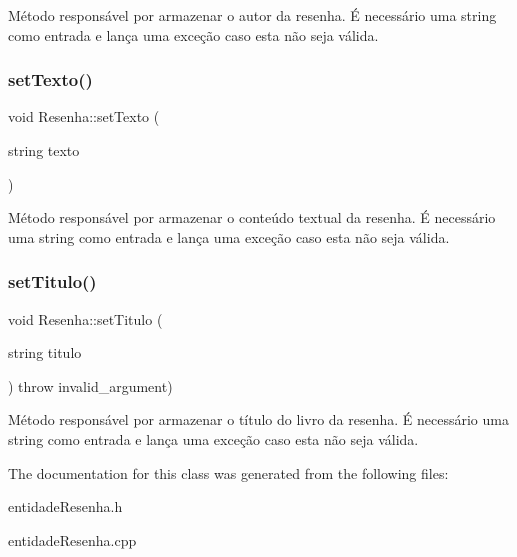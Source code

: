 Método responsável por armazenar o autor da resenha. É necessário uma string como entrada e lança uma exceção caso esta não seja válida. \mbox{\label{classResenha_ad760365db2202742706238d74fe55e6e}} 
\subsubsection{\texorpdfstring{set\+Texto()}{setTexto()}}
{\footnotesize\ttfamily void Resenha\+::set\+Texto (\begin{DoxyParamCaption}\item[{string}]{texto }\end{DoxyParamCaption})\hspace{0.3cm}{\ttfamily [inline]}}

Método responsável por armazenar o conteúdo textual da resenha. É necessário uma string como entrada e lança uma exceção caso esta não seja válida. \mbox{\label{classResenha_aa2e063e37df9f280258bf1bb492bf818}} 
\subsubsection{\texorpdfstring{set\+Titulo()}{setTitulo()}}
{\footnotesize\ttfamily void Resenha\+::set\+Titulo (\begin{DoxyParamCaption}\item[{string}]{titulo }\end{DoxyParamCaption}) throw  invalid\+\_\+argument) \hspace{0.3cm}{\ttfamily [inline]}}

Método responsável por armazenar o título do livro da resenha. É necessário uma string como entrada e lança uma exceção caso esta não seja válida. 

The documentation for this class was generated from the following files\+:\begin{DoxyCompactItemize}
\item 
entidade\+Resenha.\+h\item 
entidade\+Resenha.\+cpp\end{DoxyCompactItemize}
